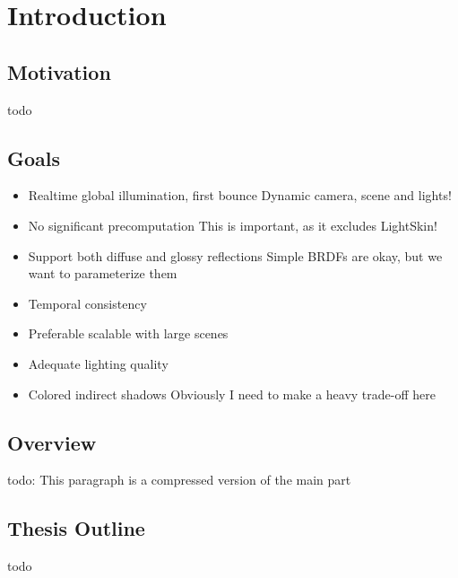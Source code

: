 \documentclass[thesis.tex]{subfiles}
\begin{document}
\chapter{Introduction}
\label{chap:introduction}

\section{Motivation}
todo

\section{Goals}
\begin{itemize}
\item Realtime global illumination, first bounce
\subitem Dynamic camera, scene and lights!
\item No significant precomputation
\subitem This is important, as it excludes LightSkin!
\item Support both diffuse and glossy reflections
\subitem Simple BRDFs are okay, but we want to parameterize them 
\item Temporal consistency
\item Preferable scalable with large scenes
\item Adequate lighting quality
\item Colored indirect shadows
\subitem Obviously I need to make a heavy trade-off here
\end{itemize}

\section{Overview}
todo: This paragraph is a compressed version of the main part

\section{Thesis Outline}
todo

\subfilebib %
\end{document}
